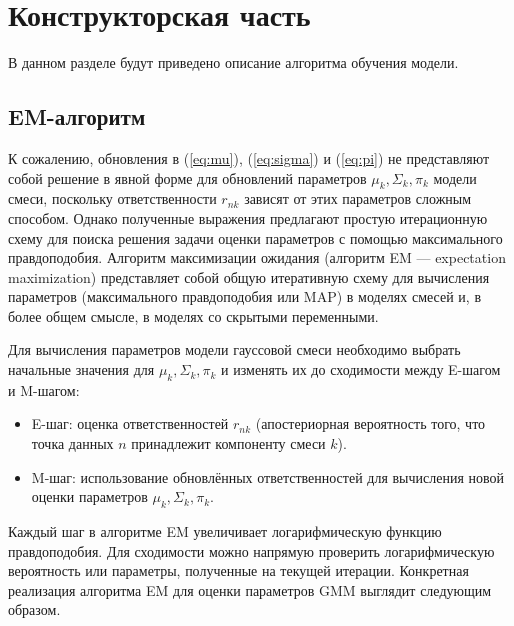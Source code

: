 \chapter{Конструкторская часть}

В данном разделе будут приведено описание алгоритма обучения модели.

\section{EM-алгоритм}

К сожалению, обновления в (\ref{eq:mu}), (\ref{eq:sigma}) и (\ref{eq:pi}) не представляют собой
решение в явной форме для обновлений параметров $\mu_k, \Sigma_k, \pi_k$ модели смеси,
поскольку ответственности $r_{nk}$ зависят от этих параметров сложным способом.
Однако полученные выражения предлагают простую итерационную схему для поиска решения задачи оценки параметров с помощью максимального правдоподобия.
Алгоритм максимизации ожидания (алгоритм EM — expectation maximization) представляет собой общую итеративную схему для вычисления параметров (максимального правдоподобия или MAP)
в моделях смесей и, в более общем смысле, в моделях со скрытыми переменными.~\cite{dempster}

Для вычисления параметров модели гауссовой смеси необходимо выбрать начальные значения
для $\mu_k, \Sigma_k, \pi_k$ и изменять их до сходимости между E-шагом и M-шагом:

\begin{itemize}[label*=---]
	\item E-шаг: оценка ответственностей $r_{nk}$ (апостериорная вероятность того, что точка данных $n$ принадлежит компоненту смеси $k$).
	\item M-шаг: использование обновлённых ответственностей для вычисления новой оценки параметров $\mu_k, \Sigma_k, \pi_k$.
\end{itemize}

Каждый шаг в алгоритме EM увеличивает логарифмическую функцию правдоподобия. Для сходимости можно напрямую проверить логарифмическую вероятность или параметры, полученные на текущей итерации. Конкретная реализация алгоритма EM для оценки параметров GMM выглядит следующим образом.~\cite{neal}

